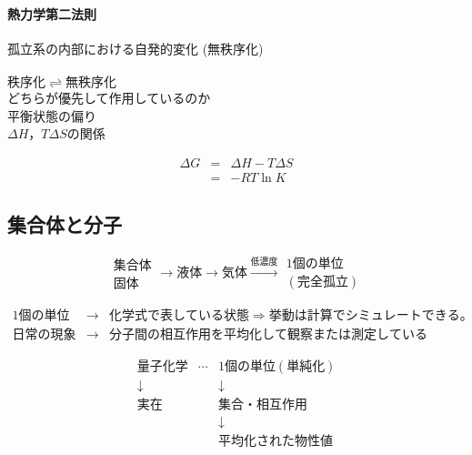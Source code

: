 \documentclass{../../../notebook}
\begin{document}
\paragraph{熱力学第二法則}

孤立系の内部における自発的変化 (無秩序化)\\\\

$\mathrm{秩序化} \rightleftharpoons \mathrm{無秩序化}$\\
どちらが優先して作用しているのか\\
平衡状態の偏り\\
$\Delta H$，$T\Delta S$の関係

\begin{eqnarray*}
  \Delta G &=& \Delta H - T\Delta S\\
  &=& -RT \ln K
\end{eqnarray*}

\subsection{集合体と分子}

\[
  \begin{array}{c}\mathrm{集合体}\\\mathrm{固体}\end{array} \longrightarrow \mathrm{液体} \longrightarrow \mathrm{気体} \xrightarrow{\mathrm{低濃度}}
    \begin{array}{c}\mathrm{1個の単位}\\\mathrm{(完全孤立)}\end{array}
\]

$\begin{array}{lll}
\mathrm{1個の単位} & \longrightarrow & \mathrm{化学式で表している状態}\Longrightarrow\mathrm{挙動は計算でシミュレートできる。}\\
\mathrm{日常の現象} & \longrightarrow & \mathrm{分子間の相互作用を平均化して観察または測定している}
\end{array}$

\[\begin{array}{ccc}
\mathrm{量子化学} & \cdots & \mathrm{1個の単位 (単純化)} \\
\downarrow & & \downarrow \\
\mathrm{実在} & & \mathrm{集合・相互作用} \\
& & \downarrow \\
& & \mathrm{平均化された物性値}
\end{array}\]
\end{document}
